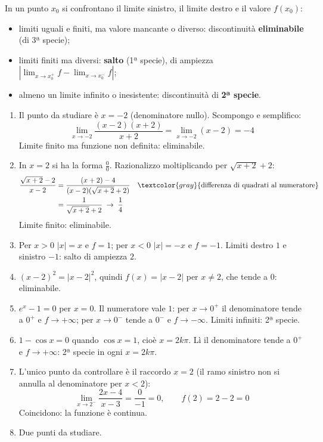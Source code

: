 \begin{question}[ID=2.1, subtitle={Punti singolari — serie 1}, tags={continuità, punti singolari}, difficulty=media]
\begin{explanation}
In un punto $x_0$ si confrontano il limite sinistro, il limite destro e il valore $f(x_0)$:
\begin{itemize}
    \item limiti uguali e finiti, ma valore mancante o diverso: discontinuità \textbf{eliminabile} (di 3ª specie);
    \item limiti finiti ma diversi: \textbf{salto} (1ª specie), di ampiezza $|\lim_{x\to x_0^+}f-\lim_{x\to x_0^-}f|$;
    \item almeno un limite infinito o inesistente: discontinuità di \textbf{2ª specie}.
\end{itemize}
\begin{enumerate}[label=\arabic*)]
    \item Il punto da studiare è $x=-2$ (denominatore nullo). Scompongo e semplifico:
    \[ \lim_{x\to-2}\dfrac{(x-2)(x+2)}{x+2}=\lim_{x\to-2}(x-2)=-4 \]
    Limite finito ma funzione non definita: eliminabile.
    \item In $x=2$ si ha la forma $\tfrac00$. Razionalizzo moltiplicando per $\sqrt{x+2}+2$:
    \[\begin{aligned}
    \dfrac{\sqrt{x+2}-2}{x-2} &= \dfrac{(x+2)-4}{(x-2)(\sqrt{x+2}+2)} && \textcolor{gray}{\text{differenza di quadrati al numeratore}}\\
    &= \dfrac{1}{\sqrt{x+2}+2}\;\to\;\dfrac14
    \end{aligned}\]
    Limite finito: eliminabile.
    \item Per $x>0$ $|x|=x$ e $f=1$; per $x<0$ $|x|=-x$ e $f=-1$. Limiti destro $1$ e sinistro $-1$: salto di ampiezza $2$.
    \item $(x-2)^2=|x-2|^2$, quindi $f(x)=|x-2|$ per $x\neq2$, che tende a $0$: eliminabile.
    \item $e^x-1=0$ per $x=0$. Il numeratore vale $1$: per $x\to0^+$ il denominatore tende a $0^+$ e $f\to+\infty$; per $x\to0^-$ tende a $0^-$ e $f\to-\infty$. Limiti infiniti: 2ª specie.
    \item $1-\cos x=0$ quando $\cos x=1$, cioè $x=2k\pi$. Lì il denominatore tende a $0^+$ e $f\to+\infty$: 2ª specie in ogni $x=2k\pi$.
    \item L'unico punto da controllare è il raccordo $x=2$ (il ramo sinistro non si annulla al denominatore per $x<2$):
    \[ \lim_{x\to2^-}\dfrac{2x-4}{x-3}=\dfrac{0}{-1}=0, \qquad f(2)=2-2=0 \]
    Coincidono: la funzione è continua.
    \item Due punti da studiare.
    \begin{itemize}

\end{itemize}
\end{enumerate}
\end{explanation}
\end{question}
